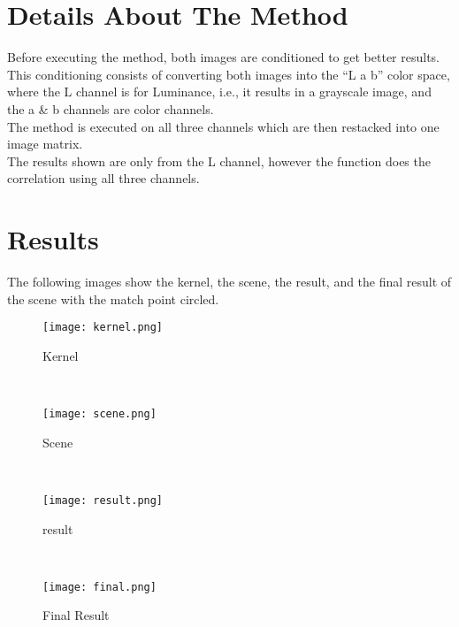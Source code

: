 \documentclass[letterpaper,11pt]{texMemo} %
\begin{document}
\section{Details About The Method}
Before executing the method, both images are conditioned to get better results. This conditioning consists of converting both images into the ``L a b'' color space, where the L channel is for Luminance, i.e., it results in a grayscale image, and the a \& b channels are color channels.\\
The method is executed on all three channels which are then restacked into one image matrix.\\
The results shown are only from the L channel, however the function does the correlation using all three channels.
\section{Results}
The following images show the kernel, the scene, the result, and the final result of the scene with the match point circled.
\begin{figure}[!h]
	\centering
		\texttt{[image: kernel.png]}
	\caption{Kernel}
	\label{fig:kernel}
\end{figure}
\\
\begin{figure}[!h]
	\centering
		\texttt{[image: scene.png]}
	\caption{Scene}
	\label{fig:scene}
\end{figure}
\\
\begin{figure}[!h]
	\centering
		\texttt{[image: result.png]}
	\caption{result}
	\label{fig:result}
\end{figure}
\\
\begin{figure}
	\centering
		\texttt{[image: final.png]}
	\caption{Final Result}
	\label{fig:final}
\end{figure}


\end{document}
